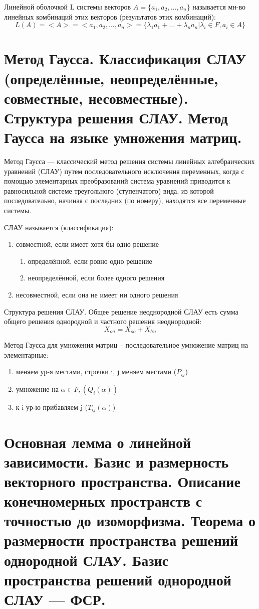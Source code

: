 \documentclass{article}
\begin{document}
\textsf{Линейной оболочкой L} системы векторов $A = \{a_1,a_2,\dots,a_n\}$ называется мн-во линейных комбинаций этих векторов (результатов этих комбинаций):
$$L(A)=<A>=<a_1,a_2,\dots,a_n>=\{\lambda_1a_1+\dots+\lambda_na_n | \lambda_i\in F, a_i\in A\}$$

\section{Метод Гаусса. Классификация СЛАУ (определённые, неопределённые, совместные, несовместные). Структура решения СЛАУ. Метод Гаусса на языке умножения матриц.}

\textsf{Метод Гаусса} — классический метод решения системы линейных алгебраических уравнений (СЛАУ) путем последовательного исключения переменных, когда с помощью элементарных преобразований система уравнений приводится к равносильной системе треугольного (ступенчатого) вида, из которой последовательно, начиная с последних (по номеру), находятся все переменные системы.

СЛАУ называется (классификация):
\begin{enumerate}
    \item совместной, если имеет хотя бы одно решение
    \begin{enumerate}
        \item определённой, если ровно одно решение
        \item неопределённой, если более одного решения
    \end{enumerate}
    \item несовместной, если она не имеет ни одного решения
\end{enumerate}

\textsf{Структура решения СЛАУ.} Общее решение неоднородной СЛАУ есть сумма общего решения однородной и частного решения неоднородной:
$$X_{on}=X_{oo}+X_{hn}$$


\textsf{Метод Гаусса для умножения матриц} – последовательное умножение матриц на элементарные:
\begin{enumerate}
    \item меняем ур-я местами, строчки i, j меняем местами ($P_{ij}$)
    \item умножение на $\alpha\in F, (Q_i(\alpha))$ 
    \item к i ур-ю прибавляем j ($T_{ij}(\alpha)$)
\end{enumerate}

\section{Основная лемма о линейной зависимости. Базис и размерность векторного пространства. Описание конечномерных пространств с точностью до изоморфизма. Теорема о размерности пространства решений однородной СЛАУ. Базис пространства решений однородной СЛАУ — ФСР.}
\end{document}
